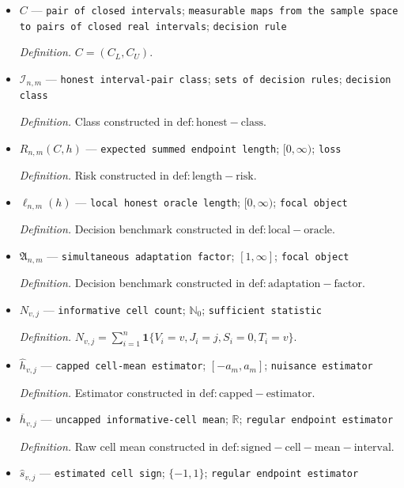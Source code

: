 \documentclass{article}
\begin{document}
\begin{itemize}
  \par\smallskip\noindent\emph{Definition.} \texttt{Second component of the endpoint confidence procedure.}
  \item \(C\) --- \texttt{pair of closed intervals}; \texttt{measurable maps from the sample space to pairs of closed real intervals}; \texttt{decision rule}
  \par\smallskip\noindent\emph{Definition.} \(C=(C_L,C_U)\).
  \item \(\mathcal I_{n,m}\) --- \texttt{honest interval-\allowbreak{}pair class}; \texttt{sets of decision rules}; \texttt{decision class}
  \par\smallskip\noindent\emph{Definition.} Class constructed in \(\mathrm{def:honest-class}\).
  \item \(R_{n,m}(C,h)\) --- \texttt{expected summed endpoint length}; \([0,\infty)\); \texttt{loss}
  \par\smallskip\noindent\emph{Definition.} Risk constructed in \(\mathrm{def:length-risk}\).
  \item \(\ell_{n,m}(h)\) --- \texttt{local honest oracle length}; \([0,\infty)\); \texttt{focal object}
  \par\smallskip\noindent\emph{Definition.} Decision benchmark constructed in \(\mathrm{def:local-oracle}\).
  \item \(\mathfrak A_{n,m}\) --- \texttt{simultaneous adaptation factor}; \([1,\infty]\); \texttt{focal object}
  \par\smallskip\noindent\emph{Definition.} Decision benchmark constructed in \(\mathrm{def:adaptation-factor}\).
  \item \(N_{v,j}\) --- \texttt{informative cell count}; \(\mathbb N_0\); \texttt{sufficient statistic}
  \par\smallskip\noindent\emph{Definition.} \(N_{v,j}=\sum_{i=1}^{n}\mathbf 1\{V_i=v,J_i=j,S_i=0,T_i=v\}\).
  \item \(\widehat h_{v,j}\) --- \texttt{capped cell-\allowbreak{}mean estimator}; \([-a_m,a_m]\); \texttt{nuisance estimator}
  \par\smallskip\noindent\emph{Definition.} Estimator constructed in \(\mathrm{def:capped-estimator}\).
  \item \(\overline h_{v,j}\) --- \texttt{uncapped informative-\allowbreak{}cell mean}; \(\mathbb R\); \texttt{regular endpoint estimator}
  \par\smallskip\noindent\emph{Definition.} Raw cell mean constructed in \(\mathrm{def:signed-cell-mean-interval}\).
  \item \(\widehat s_{v,j}\) --- \texttt{estimated cell sign}; \(\{-1,1\}\); \texttt{regular endpoint estimator}

\end{itemize}
\end{document}
